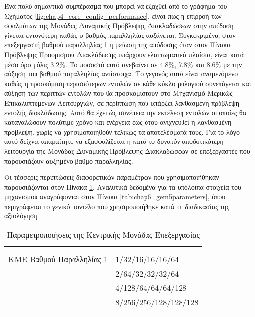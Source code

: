 Ένα πολύ σημαντικό συμπέρασμα που μπορεί να εξαχθεί από το γράφημα του Σχήματος \ref{fig:chap4_core_config_performance}, είναι πως η επιρροή των σφαλμάτων της Μονάδας Δυναμικής Πρόβλεψης Διακλαδώσεων στην απόδοση γίνεται εντονότερη καθώς ο βαθμός παραλληλίας αυξάνεται. Συγκεκριμένα, στον επεξεργαστή βαθμού παραλληλίας 1 η μείωση της απόδοσης όταν στον Πίνακα Πρόβλεψης Προορισμού Διακλάδωσης υπάρχουν ελαττωματικά πλαίσια, είναι κατά μέσο όρο μόλις 3.2\%. Το ποσοστό αυτό ανεβαίνει σε 4.8\%, 7.8\% και 8.6\% με την αύξηση του βαθμού παραλληλίας αντίστοιχα. Το γεγονός αυτό είναι αναμενόμενο καθώς η προσκόμιση περισσότερων εντολών σε κάθε κύκλο ρολογιού συνεπάγεται και αύξηση των περιττών εντολών που θα προσκομιστούν στο Μηχανισμό Μερικώς Επικαλυπτόμενων Λειτουργιών, σε περίπτωση που υπάρξει λανθασμένη πρόβλεψη εντολής διακλάδωσης. Αυτό θα έχει ώς συνέπεια την εκτέλεση εντολών οι οποίες θα καταναλώσουν πολύτιμο χρόνο και ενέργεια έως ότου ανιχνευθεί η λανθασμένη πρόβλεψη, χωρίς να χρησιμοποιηθούν τελικώς τα αποτελέσματά τους. Για το λόγο αυτό δείχνει απαραίτητο να εξασφαλίζεται η κατά το δυνατόν αποδοτικότερη λειτουργία της Μονάδας Δυναμικής Πρόβλεψης Διακλαδώσεων σε επεξεργαστές που παρουσιάζουν αυξημένο βαθμό παραλληλίας.
\par
Οι τέσσερις περιπτώσεις διαφορετικών παραμέτρων που χρησιμοποιήθηκαν παρουσιάζονται στον Πίνακα \ref{tab:chap4_CoreConfigs}. Αναλυτικά δεδομένα για τα υπόλοιπα στοιχεία του μηχανισμού αναγράφονται στον Πίνακα \ref{tab:chap6_gem5parameters}, όπου περιγράφεται το γενικό μοντέλο που χρησιμοποιήθηκε κατά τη διαδικασίας της αξιολόγηση.

\begin{table}[!b]
    \centering
    \begin{tabularx}{\textwidth}{ >{\centering\arraybackslash}X >{\centering\arraybackslash}X }
    \Xhline{4\arrayrulewidth}
        \multirow{2}{*}{\textbf{Μοντέλο Εξομοίωσης}} & 
        \multirow{2}{\linewidth}{\centering \textbf{Παράμετροι (\en{Width/ROB/IQ/LQ/SQ/Registers})}} \\
        &    \\
        \Xhline{4\arrayrulewidth}
        {ΚΜΕ Βαθμού Παραλληλίας 1} & {1/32/16/16/16/64} \\
        {ΚΜΕ Βαθμού Παραλληλίας 2} & {2/64/32/32/32/64} \\
        {ΚΜΕ Βαθμού Παραλληλίας 4} & {4/128/64/64/64/128} \\
        {ΚΜΕ Βαθμού Παραλληλίας 8} & {8/256/256/128/128/128} \\
        \Xhline{4\arrayrulewidth}
    \end{tabularx}
    \caption{Παραμετροποιήσεις της Κεντρικής Μονάδας Επεξεργασίας}
    \label{tab:chap4_CoreConfigs}
\end{table}

